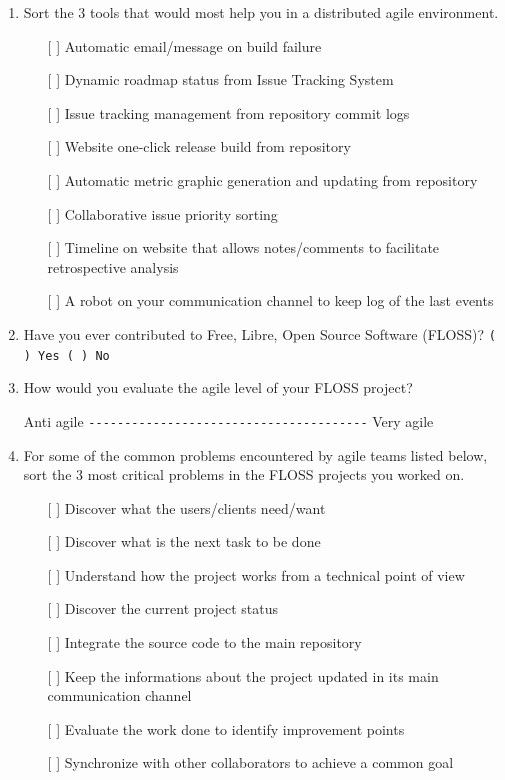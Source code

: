 \documentclass[lnbip]{svmultln}
\begin{document}
\begin{enumerate}
\item Sort the 3 tools that would most help you in a distributed agile
  environment.
  \begin{itemize}
  \item[[ ] ] Automatic email/message on build failure
  \item[[ ] ] Dynamic roadmap status from Issue Tracking System
  \item[[ ] ] Issue tracking management from repository commit logs
  \item[[ ] ] Website one-click release build from repository
  \item[[ ] ] Automatic metric graphic generation and updating from
    repository
  \item[[ ] ] Collaborative issue priority sorting
  \item[[ ] ] Timeline on website that allows notes/comments to
    facilitate retrospective analysis
  \item[[ ] ] A robot on your communication channel to keep log of the
    last events
  \end{itemize}
\vspace{10pt}

\item Have you ever contributed to Free, Libre, Open Source Software
  (FLOSS)?  \verb=( ) Yes ( ) No= \vspace{10pt}

\item How would you evaluate the agile level of your FLOSS project?

  Anti agile \verb=---------------------------------------= Very agile
  \vspace{10pt}

\item For some of the common problems encountered by agile teams
  listed below, sort the 3 most critical problems in the FLOSS
  projects you worked on.
  \begin{itemize}
  \item[[ ] ] Discover what the users/clients need/want
  \item[[ ] ] Discover what is the next task to be done
  \item[[ ] ] Understand how the project works from a technical point
    of view
  \item[[ ] ] Discover the current project status
  \item[[ ] ] Integrate the source code to the main repository
  \item[[ ] ] Keep the informations about the project updated in its
    main communication channel
  \item[[ ] ] Evaluate the work done to identify improvement points
  \item[[ ] ] Synchronize with other collaborators to achieve a common
    goal
  \end{itemize}
  \vspace{10pt}


\end{enumerate}
\end{document}
